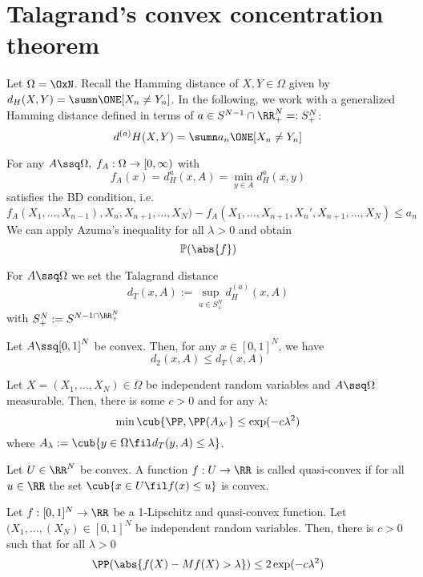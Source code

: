\section{Talagrand's convex concentration theorem}


Let $\Omega = \OxN$. Recall the Hamming distance of $X,Y\in \Omega$ given by $d_H(X,Y)= \sumn \ONE[X_n \neq Y_n]$. In the following, we work with a generalized Hamming distance defined in terms of $a \in S^{N-1}\cap \RR_+^N=: S_+^N$: 
$$d^{(a)}H(X,Y)=\sumn a_n\ONE[X_n \neq Y_n]$$


\begin{remark}
  For any \(A\ssq \Omega, \; f_A: \Omega \to [0,\infty)\) with 
  \[f_A(x)=d_H^{a}(x,A)=\min_{y\in A}d_H^{a}(x,y)\] 
  satisfies the BD condition, i.e.
  \[f_A( X_1 , \dots, X_{n-1} ),X_n, X_{n+1} , \dots , X_N ) - f_A( X_1 , \dots , X_{n+1}, X_n', X_{n+1} , \dots , X_N  ) \leq a_n \]
  We can apply Azuma's inequality for all \( \lambda>0\) and obtain 
  \[ \mathbb{P}(\abs{f})\]
\end{remark}


\begin{defn}
    For \(A\ssq \Omega\) we set the Talagrand distance 
    \[d_T(x,A):= \sup_{a\in S_+^N} d_H^{(a)}(x,A)\]
    with \(S_+^N := S^{N-1 \cap \RR^N_+}\)
\end{defn}


\begin{lem}[]
  Let \(A\ssq [0,1]^N\) be convex. Then, for any \( x\in [0,1]^N\), we have 
  \[d_2(x,A) \leq d_T(x,A)\]
\end{lem}


\begin{thm}[Talagrand]
    Let \(X= ( X_1 , \dots , X_N ) \in \Omega\) be independent random variables and \(A \ssq \Omega\) measurable. Then, there is some \(c>0\) and for any \( \lambda\):
    \[\min \cub{\PP, \PP(A_{ \lambda^c}}\leq \exp(-c \lambda^2)\]
    where \(A_\lambda:= \cub{y \in \Omega \fil d_T(y,A) \leq \lambda}\).
\end{thm}


\begin{defn}
  Let \(U\in \RR^N\) be convex. A function \(f:U \to \RR\) is called quasi-convex if for all \(u\in \RR\) the set \(\cub{x \in U \fil f(x) \leq u}\) is convex.
\end{defn}


\begin{defn}
  Let \(f:[0,1]^N \to \RR\) be a 1-Lipschitz and quasi-convex function. Let \( (X_1 , \dots , (X_N) \in [0,1]^N  \) be independent random variables. Then, there is $c>0$ such that for all \( \lambda>0\)
  \[\PP(\abs{f(X)-Mf(X)> \lambda}) \leq 2 \exp(-c \lambda^2)\]
\end{defn}


